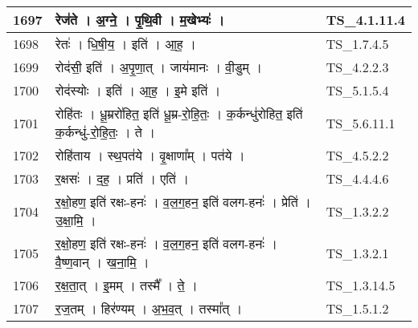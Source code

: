 \documentclass[17pt]{extarticle}
\begin{document}
\begin{longtable}{||p{0.4in}||p{4.9in}||p{0.9in}||}
    \hline
        
    1697 & रेज॑ते   ।   अ॒ग्ने॒   ।   पृ॒थि॒वी   ।   म॒खेभ्यः॑   ।    & TS\_4.1.11.4       \\
    
    \hline
        
    1698 & रेतः॑   ।   धि॒षी॒य॒   ।   इति॑   ।   आ॒ह॒   ।    & TS\_1.7.4.5       \\
    
    \hline
        
    1699 & रोद॑सी॒ इति॑   ।   अ॒पृ॒णा॒त्   ।   जाय॑मानः   ।   वी॒डुम्   ।    & TS\_4.2.2.3       \\
    
    \hline
        
    1700 & रोद॑स्योः   ।   इति॑   ।   आ॒ह॒   ।   इ॒मे इति॑   ।    & TS\_5.1.5.4       \\
    
    \hline
        
    1701 & रोहि॑तः   ।   धू॒म्ररो॑हित॒ इति॑ धू॒म्र{-}रो॒हि॒तः॒   ।   क॒र्कन्धु॑रोहित॒ इति॑ क॒र्कन्धु॑{-}रो॒हि॒तः॒   ।   ते   ।    & TS\_5.6.11.1       \\
    
    \hline
        
    1702 & रोहि॑ताय   ।   स्थ॒पत॑ये   ।   वृ॒क्षाणा᳚म्   ।   पत॑ये   ।    & TS\_4.5.2.2       \\
    
    \hline
        
    1703 & र॒क्षसः॑   ।   द॒ह॒   ।   प्रति॑   ।   एति॑   ।    & TS\_4.4.4.6       \\
    
    \hline
        
    1704 & र॒क्षो॒हण॒ इति॑ रक्षः{-}हनः॑   ।   व॒ल॒ग॒हन॒ इति॑ वलग{-}हनः॑   ।   प्रेति॑   ।   उ॒क्षा॒मि॒   ।    & TS\_1.3.2.2       \\
    
    \hline
        
    1705 & र॒क्षो॒हण॒ इति॑ रक्षः{-}हनः॑   ।   व॒ल॒ग॒हन॒ इति॑ वलग{-}हनः॑   ।   वै॒ष्ण॒वान्   ।   ख॒ना॒मि॒   ।    & TS\_1.3.2.1       \\
    
    \hline
        
    1706 & र॒क्ष॒ता॒त्   ।   इ॒मम्   ।   तस्मै᳚   ।   ते॒   ।    & TS\_1.3.14.5       \\
    
    \hline
        
    1707 & र॒ज॒तम्   ।   हिर॑ण्यम्   ।   अ॒भ॒व॒त्   ।   तस्मा᳚त्   ।    & TS\_1.5.1.2       \\
    

\end{longtable}
\end{document}
